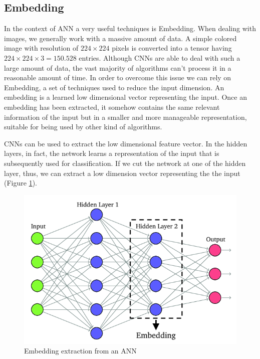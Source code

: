 \subsection{Embedding}
\label{sec:embedding}
In the context of \ac{ANN} a very useful techniques is Embedding. When dealing with images, we generally work with a massive amount of data. A simple colored image with resolution of $224 \times 224$ pixels is converted into a tensor having $224 \times 224 \times 3 = 150.528$ entries. Although \acp{CNN} are able to deal with such a large amount of data, the vast majority of algorithms can't process it in a reasonable amount of time.
In order to overcome this issue we can rely on Embedding, a set of techniques used to reduce the input dimension. An embedding is a learned low dimensional vector representing the input. Once an embedding has been extracted, it somehow contains the same relevant information of the input but in a smaller and more manageable representation, suitable for being used by other kind of algorithms. 

\vspace{5mm}

\acp{CNN} can be used to extract the low dimensional feature vector. In the hidden layers, in fact, the network learns a representation of the input that is subsequently used for classification. If we cut the network at one of the hidden layer, thus, we can extract a low dimension vector representing the the input (Figure \ref{fig:tenth_figure}).


\begin{figure}[htbp!]
\centering
\includegraphics[scale=0.5]{Tesi/images/Embedding}
\caption{Embedding extraction from an \ac{ANN}}
\label{fig:tenth_figure}
\end{figure}


